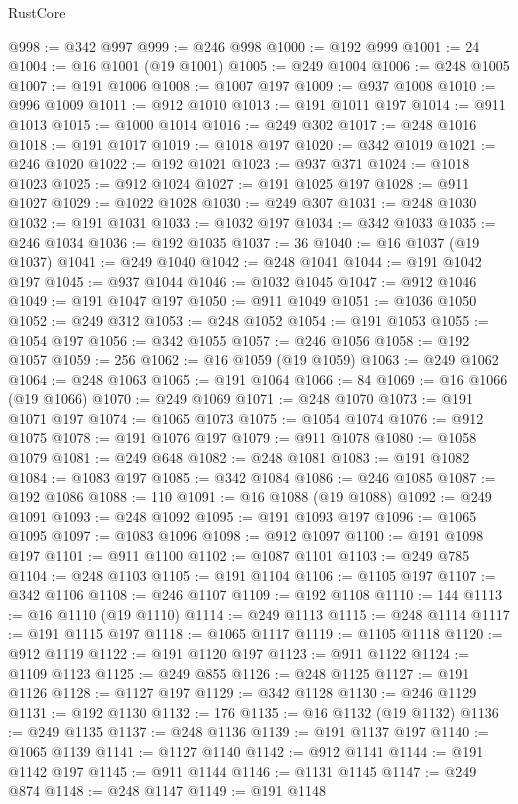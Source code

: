 \begin{lexlean}{RustCore}
\begin{coremodule}
@998 := @342 @997
@999 := @246 @998
@1000 := @192 @999
@1001 := 24
@1004 := @16 @1001 (@19 @1001)
@1005 := @249 @1004
@1006 := @248 @1005
@1007 := @191 @1006
@1008 := @1007 @197
@1009 := @937 @1008
@1010 := @996 @1009
@1011 := @912 @1010
@1013 := @191 @1011 @197
@1014 := @911 @1013
@1015 := @1000 @1014
@1016 := @249 @302
@1017 := @248 @1016
@1018 := @191 @1017
@1019 := @1018 @197
@1020 := @342 @1019
@1021 := @246 @1020
@1022 := @192 @1021
@1023 := @937 @371
@1024 := @1018 @1023
@1025 := @912 @1024
@1027 := @191 @1025 @197
@1028 := @911 @1027
@1029 := @1022 @1028
@1030 := @249 @307
@1031 := @248 @1030
@1032 := @191 @1031
@1033 := @1032 @197
@1034 := @342 @1033
@1035 := @246 @1034
@1036 := @192 @1035
@1037 := 36
@1040 := @16 @1037 (@19 @1037)
@1041 := @249 @1040
@1042 := @248 @1041
@1044 := @191 @1042 @197
@1045 := @937 @1044
@1046 := @1032 @1045
@1047 := @912 @1046
@1049 := @191 @1047 @197
@1050 := @911 @1049
@1051 := @1036 @1050
@1052 := @249 @312
@1053 := @248 @1052
@1054 := @191 @1053
@1055 := @1054 @197
@1056 := @342 @1055
@1057 := @246 @1056
@1058 := @192 @1057
@1059 := 256
@1062 := @16 @1059 (@19 @1059)
@1063 := @249 @1062
@1064 := @248 @1063
@1065 := @191 @1064
@1066 := 84
@1069 := @16 @1066 (@19 @1066)
@1070 := @249 @1069
@1071 := @248 @1070
@1073 := @191 @1071 @197
@1074 := @1065 @1073
@1075 := @1054 @1074
@1076 := @912 @1075
@1078 := @191 @1076 @197
@1079 := @911 @1078
@1080 := @1058 @1079
@1081 := @249 @648
@1082 := @248 @1081
@1083 := @191 @1082
@1084 := @1083 @197
@1085 := @342 @1084
@1086 := @246 @1085
@1087 := @192 @1086
@1088 := 110
@1091 := @16 @1088 (@19 @1088)
@1092 := @249 @1091
@1093 := @248 @1092
@1095 := @191 @1093 @197
@1096 := @1065 @1095
@1097 := @1083 @1096
@1098 := @912 @1097
@1100 := @191 @1098 @197
@1101 := @911 @1100
@1102 := @1087 @1101
@1103 := @249 @785
@1104 := @248 @1103
@1105 := @191 @1104
@1106 := @1105 @197
@1107 := @342 @1106
@1108 := @246 @1107
@1109 := @192 @1108
@1110 := 144
@1113 := @16 @1110 (@19 @1110)
@1114 := @249 @1113
@1115 := @248 @1114
@1117 := @191 @1115 @197
@1118 := @1065 @1117
@1119 := @1105 @1118
@1120 := @912 @1119
@1122 := @191 @1120 @197
@1123 := @911 @1122
@1124 := @1109 @1123
@1125 := @249 @855
@1126 := @248 @1125
@1127 := @191 @1126
@1128 := @1127 @197
@1129 := @342 @1128
@1130 := @246 @1129
@1131 := @192 @1130
@1132 := 176
@1135 := @16 @1132 (@19 @1132)
@1136 := @249 @1135
@1137 := @248 @1136
@1139 := @191 @1137 @197
@1140 := @1065 @1139
@1141 := @1127 @1140
@1142 := @912 @1141
@1144 := @191 @1142 @197
@1145 := @911 @1144
@1146 := @1131 @1145
@1147 := @249 @874
@1148 := @248 @1147
@1149 := @191 @1148

\end{coremodule}
\end{lexlean}
